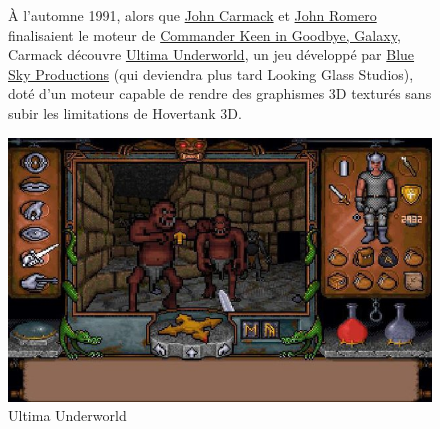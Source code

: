 \documentclass[12pt]{report}
\begin{document}
\begin{figure}[H]
	\begin{minipage}{0.48\textwidth}
		À l'automne 1991, alors que \href{https://fr.wikipedia.org/wiki/John_Carmack}{John Carmack} et 
		\href{https://fr.wikipedia.org/wiki/John_Romero}{John Romero} finalisaient le moteur de 
		\href{https://en.wikipedia.org/wiki/Commander_Keen_in_Goodbye,_Galaxy}{Commander Keen in Goodbye, Galaxy}, Carmack 
		découvre \href{https://fr.wikipedia.org/wiki/Ultima_Underworld}{Ultima Underworld}, un jeu développé par 
		\href{https://fr.wikipedia.org/wiki/Looking_Glass_Studios}{Blue Sky Productions} (qui deviendra plus tard Looking Glass Studios), 
		doté d'un moteur capable de rendre des graphismes 3D 
		texturés sans subir les limitations de Hovertank 3D.
	\end{minipage}\hfill
	\begin{minipage}{0.48\textwidth}
		\centering
		\includegraphics[width=\linewidth]{image/Ultima_Underworld.jpg}
		\hspace*{-0.5cm}
		\caption{Ultima Underworld}
		\label{fig:ultimaunderworld}
	\end{minipage}
\end{figure}
\end{document}
